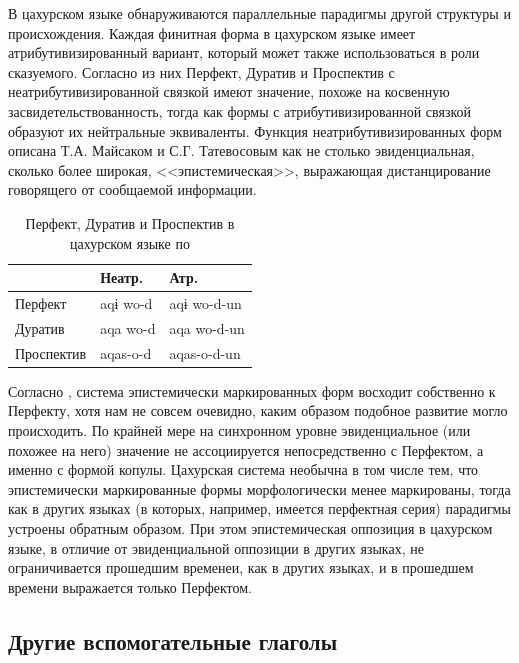 \par В цахурском языке обнаруживаются параллельные парадигмы другой структуры и происхождения. Каждая финитная форма в цахурском языке имеет атрибутивизированный вариант, который может также использоваться в роли сказуемого. Согласно \citep{maisaktatevosov2007} из них Перфект, Дуратив и Проспектив с неатрибутивизированной связкой имеют значение, похоже на косвенную засвидетельствованность, тогда как формы с атрибутивизированной связкой образуют их нейтральные эквиваленты. Функция неатрибутивизированных форм описана Т.А. Майсаком и С.Г. Татевосовым как не столько эвиденциальная, сколько более широкая, <<эпистемическая>>, выражающая дистанцирование говорящего от сообщаемой информации.

\begin{table}[H]
\caption{Перфект, Дуратив и Проспектив в цахурском языке по \citep{maisaktatevosov2007}}
\vspace{0.1cm}
\label{tab:tsakhparad}
\begin{center}
\begin{tabular}{l|ll}
           & Неатр.   & Атр.        \\ \hline
Перфект    & aqɨ wo-d & aqɨ wo-d-un \\
Дуратив    & aqa wo-d & aqa wo-d-un \\
Проспектив & aqas-o-d & aqas-o-d-un
\end{tabular}
\end{center}
\end{table}

Согласно \citep{maisaktatevosov2007}, система эпистемически маркированных форм восходит собственно к Перфекту, хотя нам не совсем очевидно, каким образом подобное развитие могло происходить. По крайней мере на синхронном уровне эвиденциальное (или похожее на него) значение не ассоциируется непосредственно с Перфектом, а именно с формой копулы. Цахурская система необычна в том числе тем, что эпистемически маркированные формы морфологически менее маркированы, тогда как в других языках (в которых, например, имеется перфектная серия) парадигмы устроены обратным образом. При этом эпистемическая оппозиция в цахурском языке, в отличие от эвиденциальной оппозиции в других языках, не ограничивается прошедшим временеи, как в других языках, и в прошедшем времени выражается только Перфектом.

\subsection{Другие вспомогательные глаголы} \label{sec:otheraux}

